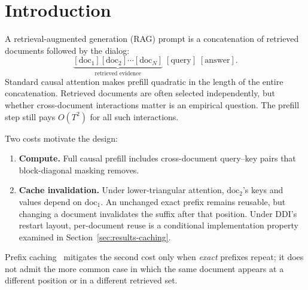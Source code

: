 \section{Introduction}
\label{sec:intro}

A retrieval-augmented generation (RAG) prompt is a concatenation of retrieved
documents followed by the dialog:
\begin{equation*}
\underbrace{[\mathrm{doc}_1][\mathrm{doc}_2] \cdots [\mathrm{doc}_N]}_{\text{retrieved evidence}}
\; [\mathrm{query}]\;[\mathrm{answer}].
\end{equation*}
Standard causal attention makes prefill quadratic in the length of the
entire concatenation. Retrieved documents are often selected independently,
but whether cross-document interactions matter is an empirical question. The
prefill step still pays $O(T^2)$ for all such interactions.

Two costs motivate the design:
\begin{enumerate}
    \item \textbf{Compute.} Full causal prefill includes cross-document
          query--key pairs that block-diagonal masking removes.
    \item \textbf{Cache invalidation.} Under lower-triangular attention,
          $\mathrm{doc}_2$'s keys and values depend on $\mathrm{doc}_1$.
          An unchanged exact prefix remains reusable, but changing a document
          invalidates the suffix after that position. Under DDI's restart
          layout, per-document reuse is a conditional implementation property
          examined in Section~\ref{sec:results-caching}.
\end{enumerate}
Prefix caching~\citep{kwon2023pagedattention} mitigates the second cost only
when \emph{exact} prefixes repeat; it does not admit the more common case in
which the same document appears at a different position or in a different
retrieved set.

